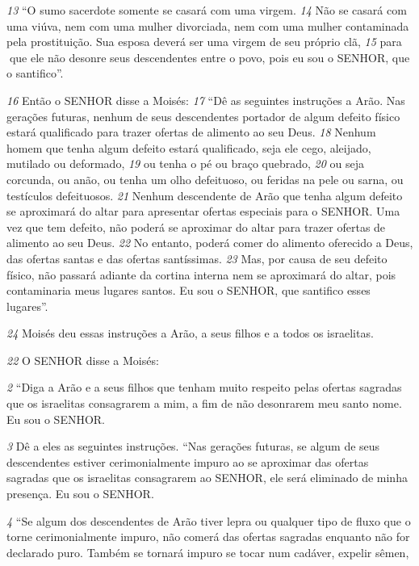 \textit{\tiny 13}
“O sumo sacerdote somente se casará com uma virgem. 
\textit{\tiny 14}
Não se casará com
uma viúva, nem com uma mulher divorciada, nem com uma mulher contaminada
pela prostituição. Sua esposa deverá ser uma virgem de seu próprio clã, 
\textit{\tiny 15}
para
que ele não desonre seus descendentes entre o povo, pois eu sou o SENHOR, que o
santifico”.
   
\textit{\tiny 16}
Então o SENHOR disse a Moisés: 
\textit{\tiny 17}
“Dê as seguintes instruções a Arão. Nas
gerações futuras, nenhum de seus descendentes portador de algum defeito físico
estará qualificado para trazer ofertas de alimento ao seu Deus. 
\textit{\tiny 18}
Nenhum
homem que tenha algum defeito estará qualificado, seja ele cego, aleijado,
mutilado ou deformado, 
\textit{\tiny 19}
ou tenha o pé ou braço quebrado, 
\textit{\tiny 20}
ou seja corcunda,
ou anão, ou tenha um olho defeituoso, ou feridas na pele ou sarna, ou testículos
defeituosos. 
\textit{\tiny 21}
Nenhum descendente de Arão que tenha algum defeito se
aproximará do altar para apresentar ofertas especiais para o SENHOR. Uma vez que
tem defeito, não poderá se aproximar do altar para trazer ofertas de alimento ao
seu Deus. 
\textit{\tiny 22}
No entanto, poderá comer do alimento oferecido a Deus, das ofertas
santas e das ofertas santíssimas. 
\textit{\tiny 23}
Mas, por causa de seu defeito físico, não
passará adiante da cortina interna nem se aproximará do altar, pois contaminaria
meus lugares santos. Eu sou o SENHOR, que santifico esses lugares”.
   
\textit{\tiny 24}
Moisés deu essas instruções a Arão, a seus filhos e a todos os israelitas.

   
\textit{\tiny 22}
 O SENHOR disse a Moisés:
 
\textit{\tiny 2} “Diga a Arão e a seus filhos que tenham muito
respeito pelas ofertas sagradas que os israelitas consagrarem a mim, a fim de não
desonrarem meu santo nome. Eu sou o SENHOR.
 
\textit{\tiny 3} Dê a eles as seguintes instruções.
   “Nas gerações futuras, se algum de seus descendentes estiver cerimonialmente
impuro ao se aproximar das ofertas sagradas que os israelitas consagrarem ao
SENHOR, ele será eliminado de minha presença. Eu sou o SENHOR.
   
\textit{\tiny 4} “Se algum dos descendentes de Arão tiver lepra
 ou qualquer tipo de fluxo
que o torne cerimonialmente impuro, não comerá das ofertas sagradas enquanto
não for declarado puro. Também se tornará impuro se tocar num cadáver, expelir
sêmen,
 
